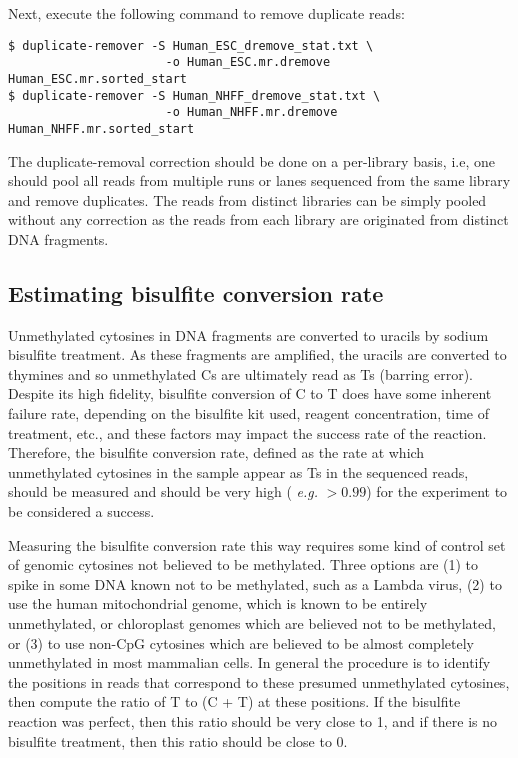 \documentclass[10pt]{article}
\begin{document}
Next, execute the following command to remove duplicate reads:

\begin{verbatim}
$ duplicate-remover -S Human_ESC_dremove_stat.txt \
                      -o Human_ESC.mr.dremove Human_ESC.mr.sorted_start
$ duplicate-remover -S Human_NHFF_dremove_stat.txt \
                      -o Human_NHFF.mr.dremove Human_NHFF.mr.sorted_start
\end{verbatim}

The duplicate-removal correction should be done on a per-library
basis, i.e, one should pool all reads from multiple runs or lanes
sequenced from the same library and remove duplicates. The reads from
distinct libraries can be simply pooled without any correction as the
reads from each library are originated from distinct DNA
fragments.


\subsection{Estimating bisulfite conversion rate}
\label{sec:estim-busilf-conv}

Unmethylated cytosines in DNA fragments are converted to uracils by
sodium bisulfite treatment. As these fragments are amplified, the
uracils are converted to thymines and so unmethylated Cs are
ultimately read as Ts (barring error). Despite its high fidelity,
bisulfite conversion of C to T does have some inherent failure rate,
depending on the bisulfite kit used, reagent concentration, time of
treatment, etc., and these factors may impact the success rate of the
reaction. Therefore, the bisulfite conversion rate, defined as the
rate at which unmethylated cytosines in the sample appear as Ts in the
sequenced reads, should be measured and should be very high ({\em
e.g.} $>0.99$) for the experiment to be considered a success.

Measuring the bisulfite conversion rate this way requires some kind of
control set of genomic cytosines not believed to be methylated. Three
options are (1) to spike in some DNA known not to be methylated, such
as a Lambda virus, (2) to use the human mitochondrial genome, which
is known to be entirely unmethylated, or chloroplast genomes
which are believed not to be methylated, or (3) to use non-CpG cytosines
which are believed to be almost completely unmethylated in most
mammalian cells. In general the procedure is to identify the positions
in reads that correspond to these presumed unmethylated cytosines,
then compute the ratio of T to (C + T) at these positions. If the
bisulfite reaction was perfect, then this ratio should be very close
to 1, and if there is no bisulfite treatment, then this ratio should
be close to 0.
\end{document}
